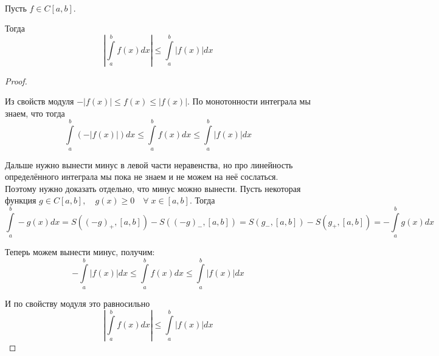 \documentclass[../main.tex]{subfiles}
\begin{document}
\begin{thm}

    ~

    Пусть \( f \in C\left[ a,b\right]\).

    Тогда
    \[ \left| \displaystyle\int\limits_{ a}^{ b} f\left( x\right)dx\right| \leq \displaystyle\int\limits_{ a}^{ b} \left| f\left( x\right)\right|dx\]
\end{thm}

\begin{proof}
    
    ~

    Из свойств модуля \( -\left| f\left( x\right)\right| \leq f\left( x\right) \leq \left| f\left( x\right)\right|\). По монотонности интеграла мы знаем, что тогда 
    \[ \displaystyle\int\limits_{ a}^{ b} \left( -\left| f\left( x\right)\right|\right)dx \leq \displaystyle\int\limits_{ a}^{ b} f\left( x\right)dx \leq \displaystyle\int\limits_{ a}^{ b} \left| f\left( x\right)\right|dx\]

    Дальше нужно вынести минус в левой части неравенства, но про линейность определённого интеграла мы пока не знаем и не можем на неё сослаться. Поэтому нужно доказать отдельно, что минус можно вынести. Пусть некоторая функция \( g \in C\left[ a,b\right],\quad g \left( x\right) \geq 0\quad \forall \; x \in \left[ a,b\right]\). Тогда
    \[\displaystyle\int\limits_{ a}^{ b} -g \left( x\right)dx=S\left( (-g)_+, \left[ a,b\right]\right) - S\left( (-g)_-, \left[ a,b\right]\right)=S\left( g_-, \left[ a,b\right]\right)-S\left( g_+, \left[ a,b\right]\right)=- \displaystyle\int\limits_{ a}^{ b} g \left( x\right)dx\]

    Теперь можем вынести минус, получим:
    \[ - \displaystyle\int\limits_{ a}^{ b} \left| f\left( x\right)\right|dx \leq \displaystyle\int\limits_{ a}^{ b} f\left( x\right)dx \leq \displaystyle\int\limits_{ a}^{ b} \left| f\left( x\right)\right|dx\]

    И по свойству модуля это равносильно
    \[ \left| \displaystyle\int\limits_{ a}^{ b} f\left( x\right)dx\right| \leq \displaystyle\int\limits_{ a}^{ b} \left| f\left( x\right)\right|dx\]
\end{proof}
\end{document}
